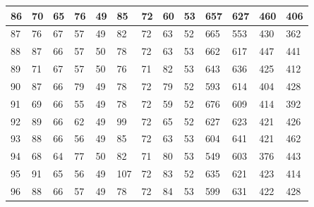 \documentclass[legalpaper,12pt]{article}
\begin{document}
\begin{table}[h]
\begin{tabular}{|l|l|l|l|l|l|l|l|l|l|l|l|l|}
86                                        & 70         & 65        & 76          & 49         & 85         & 72        & 60          & 53         & 657        & 627       & 460         & 406        \\ \hline
87                                        & 76         & 67        & 57          & 49         & 82         & 72        & 63          & 52         & 665        & 553       & 430         & 362        \\ \hline
88                                        & 87         & 66        & 57          & 50         & 78         & 72        & 63          & 53         & 662        & 617       & 447         & 441        \\ \hline
89                                        & 71         & 67        & 57          & 50         & 76         & 71        & 82          & 53         & 643        & 636       & 425         & 412        \\ \hline
90                                        & 87         & 66        & 79          & 49         & 78         & 72        & 79          & 52         & 593        & 614       & 404         & 428        \\ \hline
91                                        & 69         & 66        & 55          & 49         & 78         & 72        & 59          & 52         & 676        & 609       & 414         & 392        \\ \hline
92                                        & 89         & 66        & 62          & 49         & 99         & 72        & 65          & 52         & 627        & 623       & 421         & 426        \\ \hline
93                                        & 88         & 66        & 56          & 49         & 85         & 72        & 63          & 53         & 604        & 641       & 421         & 462        \\ \hline
94                                        & 68         & 64        & 77          & 50         & 82         & 71        & 80          & 53         & 549        & 603       & 376         & 443        \\ \hline
95                                        & 91         & 65        & 56          & 49         & 107        & 72        & 83          & 52         & 635        & 621       & 423         & 414        \\ \hline
96                                        & 88         & 66        & 57          & 49         & 78         & 72        & 84          & 53         & 599        & 631       & 422         & 428        \\ \hline

\end{tabular}
\end{table}
\end{document}
